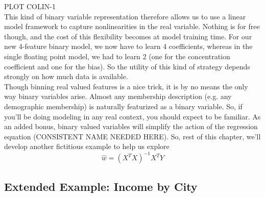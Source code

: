 PLOT COLIN-1\\

This kind of binary variable representation therefore allows us to use a linear
model framework to capture nonlinearities in the real variable.  Nothing is for
free though, and the cost of this flexibility becomes at model training time.
For our new 4-feature binary model, we now have to learn 4 coefficients, whereas
in the single floating point model, we had to learn 2 (one for the concentration
coefficient and one for the bias).  So the utility of this kind of strategy
depends strongly on how much data is available.  \\

Though binning real valued features is a nice trick, it is by no means the only
way binary variables arise.  Almost any membership description (e.g. any
demographic membership) is naturally featurized as a binary variable.  So, if
you'll be doing modeling in any real context, you should expect to be familiar.
As an added bonus, binary valued variables will simplify the action of the
regression equation (CONSISTENT NAME NEEDED HERE).  So, rest of this chapter,
we'll develop another fictitious example to help us explore 
\begin{equation} \hat{w} = (X^T X)^{-1} X^T Y \end{equation}

\subsection{Extended Example: Income by City}

